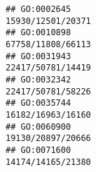 \documentclass[
]{article}
\begin{document}
\begin{verbatim}
## GO:0002645                                                                                                                                                                                                                                                                                                                                                                                            15930/12501/20371
## GO:0010898                                                                                                                                                                                                                                                                                                                                                                                            67758/11808/66113
## GO:0031943                                                                                                                                                                                                                                                                                                                                                                                            22417/50781/14419
## GO:0032342                                                                                                                                                                                                                                                                                                                                                                                            22417/50781/58226
## GO:0035744                                                                                                                                                                                                                                                                                                                                                                                            16182/16963/16160
## GO:0060900                                                                                                                                                                                                                                                                                                                                                                                            19130/20897/20666
## GO:0071600                                                                                                                                                                                                                                                                                                                                                                                            14174/14165/21380

\end{verbatim}
\end{document}
